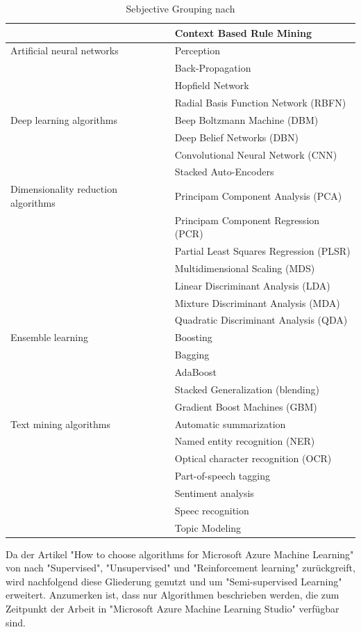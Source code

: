 \begin{table}[H]
\begin{tabular}{|l|l|}
& Context Based Rule Mining\\
\hline
Artificial neural networks & Perception\\
& Back-Propagation\\
& Hopfield Network\\
& Radial Basis Function Network (RBFN)\\
\hline
Deep learning algorithms & Beep Boltzmann Machine (DBM)\\
& Deep Belief Networks (DBN)\\
& Convolutional Neural Network (CNN)\\
& Stacked Auto-Encoders\\
\hline
Dimensionality reduction algorithms & Principam Component Analysis (PCA)\\
& Principam Component Regression (PCR)\\
& Partial Least Squares Regression (PLSR)\\
& Multidimensional Scaling (MDS)\\
& Linear Discriminant Analysis (LDA)\\
& Mixture Discriminant Analysis (MDA)\\
& Quadratic Discriminant Analysis (QDA)\\
\hline
Ensemble learning & Boosting\\
& Bagging\\
& AdaBoost\\
& Stacked Generalization (blending)\\
& Gradient Boost Machines (GBM)\\
\hline
Text mining algorithms & Automatic summarization\\
& Named entity recognition (NER)\\
& Optical character recognition (OCR)\\
& Part-of-speech tagging\\
& Sentiment analysis\\
& Speec recognition\\
& Topic Modeling\\
   \hline
\end{tabular}
\caption{Sebjective Grouping nach \citep[S.~224-229]{ramasubramanian_machine_2017}}
\label{tab:SebjectiveGrouping}
\end{table}

Da der Artikel "How to choose algorithms for Microsoft Azure Machine Learning" von \citep{ericson_microsoft_2017} nach "Supervised", "Unsupervised" und "Reinforcement learning" zurückgreift, wird nachfolgend diese Gliederung genutzt und um "Semi-supervised Learning" erweitert. Anzumerken ist, dass nur Algorithmen beschrieben werden, die zum Zeitpunkt der Arbeit in "Microsoft Azure Machine Learning Studio" verfügbar sind.

